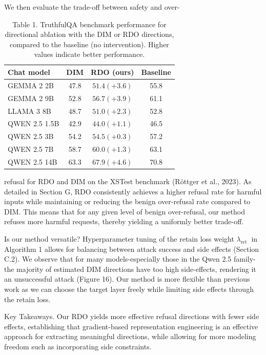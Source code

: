 \documentclass[10pt]{article}
\begin{document}
We then evaluate the trade-off between safety and over-

\begin{table}[h]
\begin{center}
\captionsetup{labelformat=empty}
\caption{Table 1. TruthfulQA benchmark performance for directional ablation with the DIM or RDO directions, compared to the baseline (no intervention). Higher values indicate better performance.}
\begin{tabular}{lccc}
\hline
Chat model & DIM & RDO (ours) & Baseline \\
\hline
GEMMA 2 2B & 47.8 & $51.4(+3.6)$ & 55.8 \\
GEMMA 2 9B & 52.8 & $56.7(+3.9)$ & 61.1 \\
LLAMA 3 8B & 48.7 & $51.0(+2.3)$ & 52.8 \\
QWEN 2.5 1.5B & 42.9 & $44.0(+1.1)$ & 46.5 \\
QWEN 2.5 3B & 54.2 & $54.5(+0.3)$ & 57.2 \\
QWEN 2.5 7B & 58.7 & $60.0(+1.3)$ & 63.1 \\
QWEN 2.5 14B & 63.3 & $67.9(+4.6)$ & 70.8 \\
\hline
\end{tabular}
\end{center}
\end{table}

refusal for RDO and DIM on the XSTest benchmark (Röttger et al., 2023). As detailed in Section G, RDO consistently achieves a higher refusal rate for harmful inputs while maintaining or reducing the benign over-refusal rate compared to DIM. This means that for any given level of benign over-refusal, our method refuses more harmful requests, thereby yielding a uniformly better trade-off.

Is our method versatile? Hyperparameter tuning of the retain loss weight $\lambda_{\text {ret }}$ in Algorithm 1 allows for balancing between attack success and side effects (Section C.2). We observe that for many models-especially those in the Qwen 2.5 family-the majority of estimated DIM directions have too high side-effects, rendering it an unsuccessful attack (Figure 16). Our method is more flexible than previous work as we can choose the target layer freely while limiting side effects through the retain loss.

Key Takeaways. Our RDO yields more effective refusal directions with fewer side effects, establishing that gradient-based representation engineering is an effective approach for extracting meaningful directions, while allowing for more modeling freedom such as incorporating side constraints.
\end{document}
